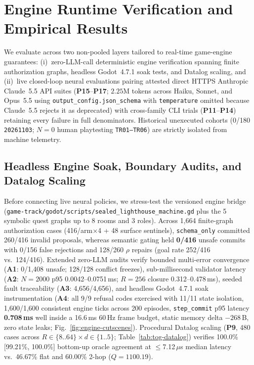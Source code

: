 \section{Engine Runtime Verification and Empirical Results}\label{sec:eval}
We evaluate \system{} across two non-pooled layers tailored to real-time game-engine guarantees: (i)~zero-LLM-call deterministic engine verification spanning finite authorization graphs, headless Godot~4.7.1 soak tests, and Datalog scaling, and (ii)~live closed-loop neural evaluations pairing attested direct HTTPS Anthropic Claude~5.5 API suites (\textbf{P15}--\textbf{P17}; $2.25\text{M}$ tokens across Haiku, Sonnet, and Opus~5.5 using \texttt{output\_config.json\_schema} with \texttt{temperature} omitted because Claude~5.5 rejects it as deprecated) with cross-family CLI trials (\textbf{P11}--\textbf{P14}) retaining every failure in full denominators. Historical unexecuted cohorts (0/180 \texttt{20261103}; $N{=}0$ human playtesting \texttt{TR01--TR06}) are strictly isolated from machine telemetry.

\subsection{Headless Engine Soak, Boundary Audits, and Datalog Scaling}\label{sec:tog-det}
Before connecting live neural policies, we stress-test the versioned engine bridge (\texttt{game-track/godot/scripts/sealed\_\allowbreak lighthouse\_\allowbreak machine.gd} plus the 5 symbolic quest graphs up to 8 rooms and 3 roles). Across 1,664 finite-graph authorization cases (416/arm$\times$4 + 48 surface sentinels), \texttt{schema\_only} committed 260/416 invalid proposals, whereas semantic gating held \textbf{0/416} unsafe commits with 0/156 false rejections and 128/260 $\rho$ repairs (goal rate 252/416 vs.\ 124/416). Extended zero-LLM audits verify bounded multi-error convergence (\textbf{A1}: 0/1,408 unsafe; 128/128 conflict freezes), sub-millisecond validator latency (\textbf{A2}: $N{=}2000$ p95 0.0042--0.0751\,ms; $R{=}256$ closure 0.312--0.478\,ms), seeded fault traceability (\textbf{A3}: 4,656/4,656), and headless Godot~4.7.1 soak instrumentation (\textbf{A4}: all 9/9 refusal codes exercised with 11/11 state isolation, 1,600/1,600 consistent engine ticks across 200 episodes, \texttt{step\_commit} p95 latency \textbf{0.708\,ms} well inside a 16.6\,ms 60\,Hz frame budget, static memory delta $-268$\,B, zero state leaks; Fig.~\ref{fig:engine-cutscenes}). Procedural Datalog scaling (\textbf{P9}, 480 cases across $R\in\{8..64\} \times d\in\{1..5\}$; Table~\ref{tab:tog-datalog}) verifies 100.0\% [99.21\%, 100.0\%] bottom-up oracle agreement at $\le$7.12\,$\mu$s median latency vs.\ 46.67\% flat and 60.00\% 2-hop ($Q{=}1100.19$).

